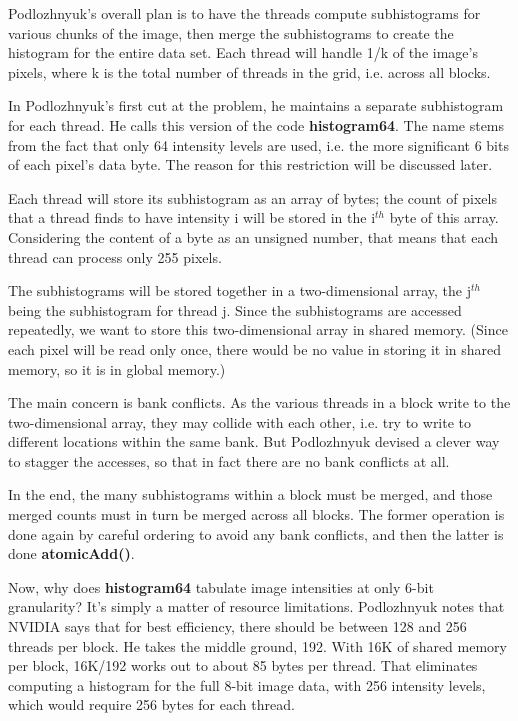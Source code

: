 Podlozhnyuk's overall plan is to have the threads compute subhistograms
for various chunks of the image, then merge the subhistograms to create
the histogram for the entire data set.  Each thread will handle 1/k of
the image's pixels, where k is the total number of threads in the grid,
i.e. across all blocks.

In Podlozhnyuk's first cut at the problem, he maintains a separate
subhistogram for each thread.  He calls this version of the code {\bf
histogram64}.  The name stems from the fact that only 64 intensity
levels are used, i.e. the more significant 6 bits of each pixel's data
byte.  The reason for this restriction will be discussed later.

Each thread will store its subhistogram as an array of bytes; the count
of pixels that a thread finds to have intensity i will be stored in the
i$^{th}$ byte of this array.  Considering the content of a byte as an
unsigned number, that means that each thread can process only 255
pixels.

The subhistograms will be stored together in a two-dimensional array,
the j$^{th}$ being the subhistogram for thread j.  Since the
subhistograms are accessed repeatedly, we want to store this
two-dimensional array in shared memory.  (Since each pixel will be read
only once, there would be no value in storing it in shared memory, so it
is in global memory.)

The main concern is bank conflicts.  As the various threads in a block
write to the two-dimensional array, they may collide with each other,
i.e. try to write to different locations within the same bank.  But
Podlozhnyuk devised a clever way to stagger the accesses, so that in
fact there are no bank conflicts at all.

In the end, the many subhistograms within a block must be merged, and
those merged counts must in turn be merged across all blocks.  The
former operation is done again by careful ordering to avoid any bank
conflicts, and then the latter is done {\bf atomicAdd()}.

Now, why does {\bf histogram64} tabulate image intensities at only 6-bit
granularity?  It's simply a matter of resource limitations.  Podlozhnyuk
notes that NVIDIA says that for best efficiency, there should be between
128 and 256 threads per block.  He takes the middle ground, 192.  With
16K of shared memory per block, 16K/192 works out to about 85 bytes per
thread.  That eliminates computing a histogram for the full 8-bit image
data, with 256 intensity levels, which would require 256 bytes for each
thread.

